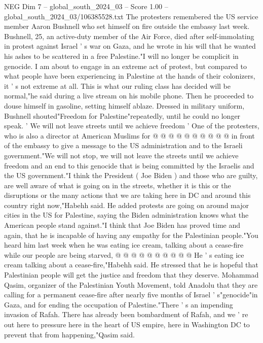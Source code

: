 \begin{textsample}{NEG Dim 7 – global\_south\_2024\_03 – Score 1.00 – global\_south\_2024\_03/106385528.txt}  \label{ex:f7_neg_295}
The protesters remembered the US service member Aaron Bushnell who set himself on fire outside the embassy last week.
Bushnell, 25, an active-duty member of the Air Force, died after self-immolating in protest against Israel ' s war on Gaza, and he wrote in his will that he wanted his ashes to be scattered in a free Palestine."I will no longer be complicit in genocide.
I am about to engage in an extreme act of protest, but compared to what people have been experiencing in Palestine at the hands of their colonizers, it ' s not extreme at all.
This is what our ruling class has decided will be normal,"he said during a live stream on his mobile phone.
Then he proceeded to douse himself in gasoline, setting himself ablaze.
Dressed in military uniform, Bushnell shouted"Freedom for Palestine"repeatedly, until he could no longer speak. ' We will not leave streets until we achieve freedom ' One of the protesters, who is also a director at American Muslims for @ @ @ @ @ @ @ @ @ @ in front of the embassy to give a message to the US administration and to the Israeli government."We will not stop, we will not leave the streets until we achieve freedom and an end to this genocide that is being committed by the Israelis and the US government."I think the President ( Joe Biden ) and those who are guilty, are well aware of what is going on in the streets, whether it is this or the disruptions or the many actions that we are taking here in DC and around this country right now,"Habehh said.
He added protests are going on around major cities in the US for Palestine, saying the Biden administration knows what the American people stand against."I think that Joe Biden has proved time and again, that he is incapable of having any empathy for the Palestinian people."You heard him last week when he was eating ice cream, talking about a cease-fire while our people are being starved, @ @ @ @ @ @ @ @ @ @ He ' s eating ice cream talking about a cease-fire,"Habehh said.
He stressed that he is hopeful that Palestinian people will get the justice and freedom that they deserve.
Mohammad Qasim, organizer of the Palestinian Youth Movement, told Anadolu that they are calling for a permanent cease-fire after nearly five months of Israel ' s"genocide"in Gaza, and for ending the occupation of Palestine."There ' s an impending invasion of Rafah.
There has already been bombardment of Rafah, and we ' re out here to pressure here in the heart of US empire, here in Washington DC to prevent that from happening,"Qasim said.

\end{textsample}
